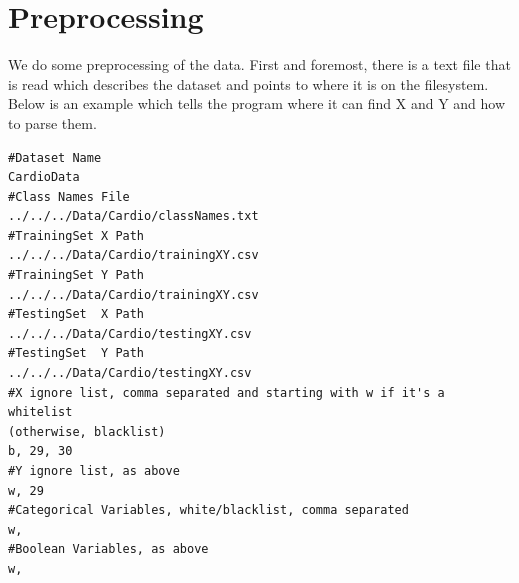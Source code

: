 \section{Preprocessing}
We do some preprocessing of the data.  First and foremost, there is a text file
that is read which describes the dataset and points to where it is on the
filesystem.  Below is an example which tells the program where it can find X and
Y and how to parse them.\pagebreak
\begin{lstlisting}[language=config, caption={Cardio Config File}, label={fig:config}]
#Dataset Name
CardioData
#Class Names File
../../../Data/Cardio/classNames.txt
#TrainingSet X Path
../../../Data/Cardio/trainingXY.csv
#TrainingSet Y Path
../../../Data/Cardio/trainingXY.csv
#TestingSet  X Path
../../../Data/Cardio/testingXY.csv
#TestingSet  Y Path
../../../Data/Cardio/testingXY.csv
#X ignore list, comma separated and starting with w if it's a whitelist
(otherwise, blacklist)
b, 29, 30
#Y ignore list, as above
w, 29
#Categorical Variables, white/blacklist, comma separated
w, 
#Boolean Variables, as above
w, 
\end{lstlisting}

